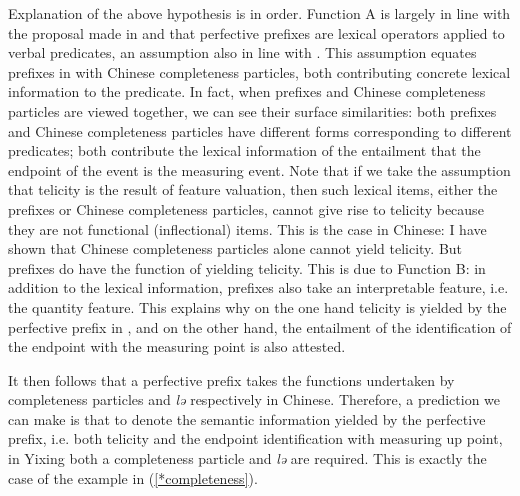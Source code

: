 \documentclass[output=paper]{langsci/langscibook}
\begin{document}
Explanation of the above hypothesis is in order. Function A is largely in line with the proposal made in \textcite{filip2005telicparameter} and \textcite{filiprothstein2005} that  perfective prefixes are lexical operators applied to verbal predicates, an assumption also in line with \textcite{partee1995quantification}. This assumption equates prefixes in  with Chinese completeness particles, both contributing concrete lexical information to the predicate. In fact, when  prefixes and Chinese completeness particles are viewed together, we can see their surface similarities: both  prefixes and Chinese completeness particles have different forms corresponding to different predicates; both contribute the lexical information of the entailment that the endpoint of the event is the measuring event. Note that if we take the assumption that telicity is the result of feature valuation, then such lexical items, either the  prefixes or Chinese completeness particles, cannot give rise to telicity because they are not functional (inflectional) items. This is the case in Chinese: I have shown that Chinese completeness particles alone cannot yield telicity. But  prefixes do have the function of yielding telicity. This is due to Function B: in addition to the lexical information,  prefixes also take an interpretable feature, i.e. the quantity feature. This explains why on the one hand telicity is yielded by the perfective prefix in , and on the other hand, the entailment of the identification of the endpoint with the measuring point is also attested.


It then follows that a  perfective prefix takes the functions undertaken by completeness particles and \emph{lə} respectively in Chinese. Therefore, a prediction we can make is that to denote the semantic information yielded by the  perfective prefix, i.e. both telicity and the endpoint identification with measuring up point, in Yixing both a completeness particle and \emph{lə} are required. This is exactly the case of the example in (\ref{*completeness}).
\end{document}
